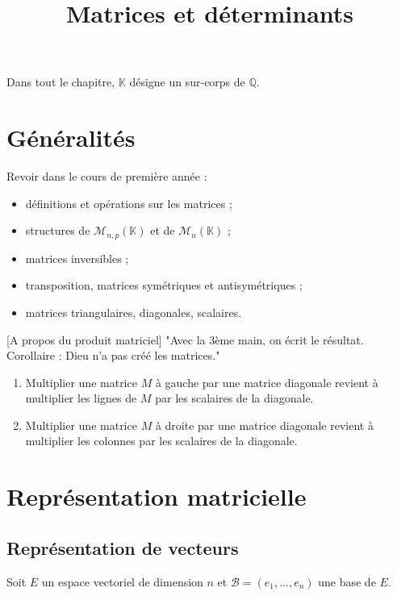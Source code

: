 \documentclass[french]{article}
\title{Matrices et déterminants}
\date{}
\newcommand{\Q}{\mathbb{Q}}
\newcommand{\K}{\mathbb{K}}
\theoremstyle{plain}
\theoremstyle{definition}
\theoremstyle{remark}
\begin{document}
\tableofcontents

\newpage
\maketitle

Dans tout le chapitre, $\K$ désigne un sur-corps de $\Q$.

\section{Généralités}

Revoir dans le cours de première année :
\begin{itemize}
	\item définitions et opérations sur les matrices ;
	\item structures de $\mathcal{M}_{n,p}(\K)$ et de $\mathcal{M}_n(\K)$ ;
	\item matrices inversibles ;
	\item transposition, matrices symétriques et antisymétriques ;
	\item matrices triangulaires, diagonales, scalaires.
\end{itemize}

[A propos du produit matriciel] "Avec la 3ème main, on écrit le résultat. Corollaire : Dieu n'a pas créé les matrices."

\begin{met}
	\begin{enumerate}
		\item Multiplier une matrice $M$ à gauche par une matrice diagonale revient à multiplier les lignes de $M$ par les scalaires de la diagonale. 
		\item Multiplier une matrice $M$ à droite par une matrice diagonale revient à multiplier les colonnes par les scalaires de la diagonale.
	\end{enumerate}
\end{met}

\section{Représentation matricielle}

\subsection{Représentation de vecteurs}

Soit $E$ un espace vectoriel de dimension $n$ et $\mathcal{B}=(e_1,\ldots,e_n)$ une base de $E$.
\end{document}
